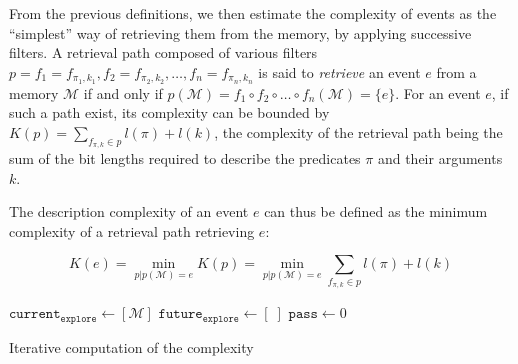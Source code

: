 \documentclass[conference]{IEEEtran}
\begin{document}
From the previous definitions, we then estimate the complexity of events as the
``simplest'' way of retrieving them from the memory, by applying successive
filters. A retrieval path composed of various filters
$p = f_{1} = f_{\pi_{1}, k_{1}}, f_{2} = f_{\pi_{2}, k_{2}}, \dots, f_{n} = f_{\pi_{n}, k_{n}}$
is said to \emph{retrieve} an event $e$ from a memory $\mathcal{M}$ if and only
if
$p(\mathcal{M}) = f_{1} \circ f_{2} \circ \dots \circ f_{n} (\mathcal{M}) = \{e\}$.
For an event $e$, if such a path exist, its complexity can be bounded by
$K(p) = \sum_{f_{\pi, k} \in p} l(\pi) + l(k)$, the complexity of the retrieval
path being the sum of the bit lengths required to describe the predicates $\pi$
and their arguments $k$.

The description complexity of an event $e$ can thus be defined as the minimum complexity of a retrieval path retrieving $e$:

\begin{equation}
  \label{eq:desc_k}
  K(e) = \min_{p | p(\mathcal{M}) = e} K(p) = \min_{p | p(\mathcal{M})=e} \sum_{f_{\pi, k} \in p} l(\pi) + l(k)
\end{equation}

\begin{algorithm}
  $\mathtt{current_{explore}} \leftarrow [\mathcal{M}]$ \;
  $\mathtt{future_{explore} \leftarrow} [\;]$ \;
  $\mathtt{pass} \leftarrow 0$ \;
  \caption{Iterative computation of the complexity}
  \label{alg:complex_iter}
\end{algorithm}
\end{document}
